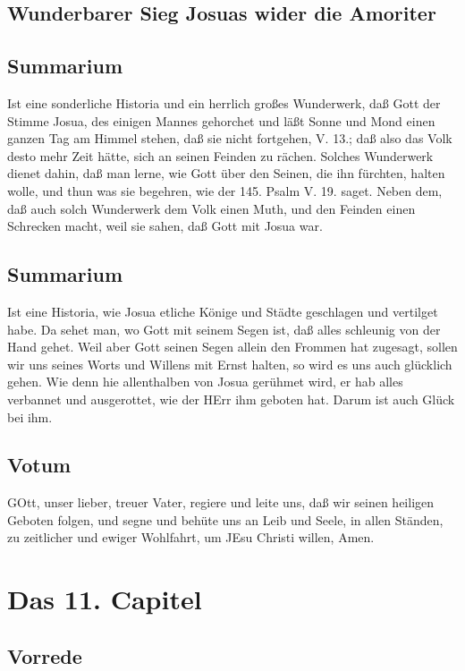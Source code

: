 \section{Wunderbarer Sieg Josuas wider die Amoriter}
\section{Summarium}

Ist eine sonderliche Historia und ein herrlich großes Wunderwerk, daß Gott der Stimme Josua, des einigen Mannes gehorchet und läßt Sonne und Mond einen ganzen Tag am Himmel stehen, daß sie nicht fortgehen, V. 13.; daß also das Volk desto mehr Zeit hätte, sich an seinen Feinden zu rächen. Solches Wunderwerk dienet dahin, daß man lerne, wie Gott über den Seinen, die ihn fürchten, halten wolle, und thun was sie begehren, wie der 145. Psalm V. 19. saget. Neben dem, daß auch solch Wunderwerk dem Volk einen Muth, und den Feinden einen Schrecken macht, weil sie sahen, daß Gott mit Josua war.
\section{Summarium}

Ist eine Historia, wie Josua etliche Könige und Städte geschlagen und vertilget habe. Da sehet man, wo Gott mit seinem Segen ist, daß alles schleunig von der Hand gehet. Weil aber Gott seinen Segen allein den Frommen hat zugesagt, sollen wir uns seines Worts und Willens mit Ernst halten, so wird es uns auch glücklich gehen. Wie denn hie allenthalben von Josua gerühmet wird, er hab alles verbannet und ausgerottet, wie der HErr ihm geboten hat. Darum ist auch Glück bei ihm.

\section{Votum}

GOtt, unser lieber, treuer Vater, regiere und leite uns, daß wir seinen heiligen Geboten folgen, und segne und behüte uns an Leib und Seele, in allen Ständen, zu zeitlicher und ewiger Wohlfahrt, um JEsu Christi willen, Amen.

\chapter{Das 11. Capitel}

\section{Vorrede}

